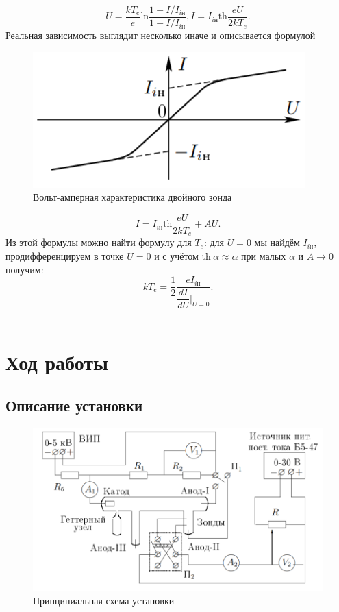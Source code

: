 \begin{equation}
    U = \dfrac{kT_e}{e}\text{ln}\dfrac{1 - I/I_{i\text{н}}}{1 + I/I_{i\text{н}}}, 
    I = I_{i\text{н}} \text{th}\dfrac{eU}{2kT_e}.
\end{equation}
Реальная зависимость выглядит несколько иначе и описывается формулой 
\begin{figure}
    \includegraphics[scale=0.8]{images/double_zond.png}
    \caption{Вольт-амперная характеристика двойного зонда}
    \vspace{+30pt}
\end{figure}
\begin{equation}
    I = I_{i\text{н}} \text{th}\dfrac{eU}{2kT_e} + AU.
\end{equation}
Из этой формулы можно найти формулу для $T_e$: для $U=0$ мы найдём $I_{i\text{н}}$, продифференцируем в точке $U=0$ и с учётом $\text{th}~\alpha \approx \alpha$ при малых $\alpha$ и $A\rightarrow 0$ получим:
\begin{equation}
    kT_e = \dfrac{1}{2}\dfrac{eI_{i\text{н}}}{\dfrac{dI}{dU}|_{U=0}}.
\end{equation}
\\

\section{Ход работы}
\subsection*{Описание установки}

\begin{figure}[!h]
    \centering
    \includegraphics[scale=0.6]{images/scheme.png}
    \caption{Принципиальная схема установки}
    \label{fig:my_label}
\end{figure}

